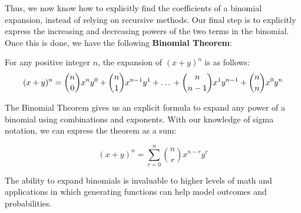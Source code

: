 \documentclass[11pt]{article}
\begin{document}
Thus, we now know how to explicitly find the coefficients of a binomial expansion, instead of relying on recursive methods. Our final step is to explicitly express the increasing and decreasing powers of the two terms in the binomial. Once this is done, we have the following \textbf{Binomial Theorem}:

\vspace{0.2 cm}
For any positive integer $n$, the expansion of $(x+y)^n$ is as follows:
\[(x+y)^n={n \choose 0}x^ny^0 + {n \choose 1}x^{n-1}y^1 + \text{\dots} + {n \choose n-1}x^1y^{n-1} + {n \choose n}x^0y^n\]

The Binomial Theorem gives us an explicit formula to expand any power of a binomial using combinations and exponents. With our knowledge of sigma notation, we can express the theorem as a sum:

\[(x+y)^n=\sum_{r=0}^n {n \choose r}x^{n-r}y^r\]

The ability to expand binomials is invaluable to higher levels of math and applications in which generating functions can help model outcomes and probabilities.
\end{document}

